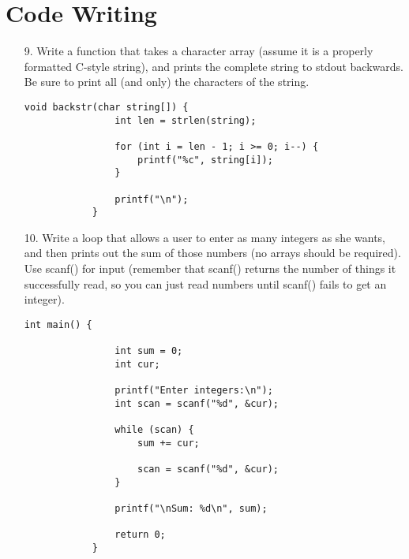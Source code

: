 \documentclass{article}
\begin{document}
\section*{Code Writing}
\begin{itemize}
	\item[9.] Write a function that takes a character array (assume it is a properly formatted C-style string), and prints the complete string to stdout backwards. Be sure to print all (and only) the characters of the string.

			\begin{lstlisting}[style=nonumbers]
			void backstr(char string[]) {
				int len = strlen(string);
				
				for (int i = len - 1; i >= 0; i--) {
					printf("%c", string[i]);
				}
				
				printf("\n");
			}
			\end{lstlisting}	

			\newpage
	\item[10.] Write a loop that allows a user to enter as many integers as she wants, and then prints out the sum of those numbers (no arrays should be required). Use scanf() for input (remember that scanf() returns the number of things it successfully read, so you can just read numbers until scanf() fails to get an integer).

		\begin{lstlisting}[style=nonumbers]
			int main() {

				int sum = 0;
				int cur;

				printf("Enter integers:\n");
				int scan = scanf("%d", &cur);

				while (scan) {
					sum += cur;

					scan = scanf("%d", &cur);
				}

				printf("\nSum: %d\n", sum);

				return 0;
			}
		\end{lstlisting}

\end{itemize}
\end{document}
